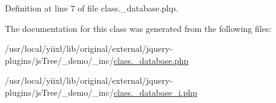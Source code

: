 Definition at line 7 of file class.\_\-database.php.



The documentation for this class was generated from the following files:\begin{DoxyCompactItemize}
\item 
/usr/local/yiixl/lib/original/external/jquery-\/plugins/jsTree/\_\-demo/\_\-inc/\hyperlink{class_8__database_8php}{class.\_\-database.php}\item 
/usr/local/yiixl/lib/original/external/jquery-\/plugins/jsTree/\_\-demo/\_\-inc/\hyperlink{class_8__database__i_8php}{class.\_\-database\_\-i.php}\end{DoxyCompactItemize}

